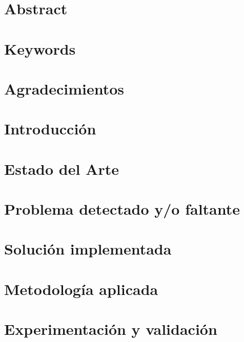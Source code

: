 \documentclass[11pt]{article}
\begin{document}


\newpage

\section{Abstract}



\section{Keywords}



\newpage

\section{Agradecimientos}



\newpage

\section{Introducción}



\section{Estado del Arte}



\section{Problema detectado y/o faltante}



\section{Solución implementada}



\section{Metodología aplicada}



\section{Experimentación y validación}
\end{document}
